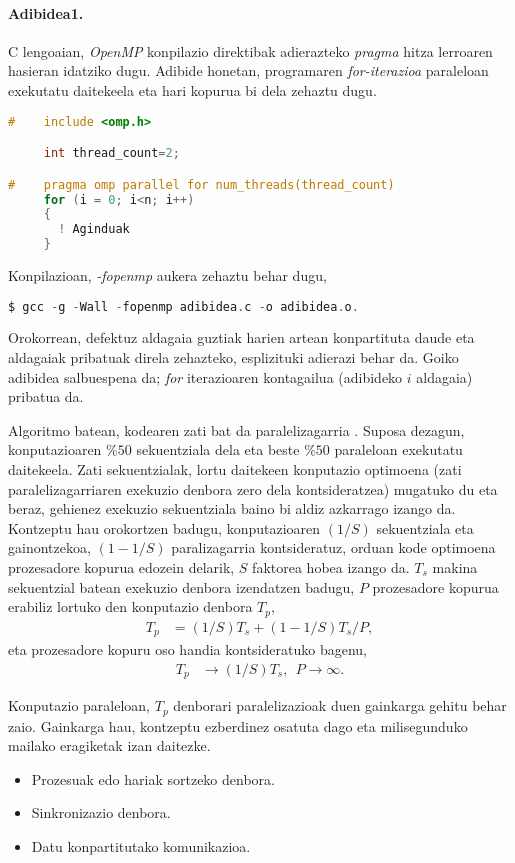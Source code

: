 \paragraph*{\textbf{Adibidea1.}} C lengoaian, \emph{OpenMP} konpilazio direktibak adierazteko \emph{pragma} hitza lerroaren hasieran idatziko dugu. Adibide honetan, programaren \emph{for-iterazioa} paraleloan exekutatu daitekeela  eta hari kopurua bi dela zehaztu dugu. 

\begin{lstlisting}[language=C]
#    include <omp.h>

     int thread_count=2;

#    pragma omp parallel for num_threads(thread_count) 
     for (i = 0; i<n; i++)
     {
       ! Aginduak 
     }
\end{lstlisting}

Konpilazioan, \emph{-fopenmp} aukera zehaztu behar dugu,
\begin{lstlisting}[language=C]
$ gcc -g -Wall -fopenmp adibidea.c -o adibidea.o.
\end{lstlisting}
Orokorrean, defektuz aldagaia guztiak harien artean konpartituta daude eta aldagaiak pribatuak direla zehazteko, esplizituki adierazi behar da. Goiko adibidea salbuespena da; \emph{for} iterazioaren kontagailua  (adibideko $i$ aldagaia) pribatua da.

Algoritmo batean, kodearen zati bat  da paralelizagarria \cite{Pacheco2011}. Suposa dezagun, konputazioaren $\%50$ sekuentziala dela eta beste $\%50$ paraleloan exekutatu daitekeela. Zati sekuentzialak, lortu daitekeen konputazio optimoena (zati paralelizagarriaren exekuzio denbora zero dela kontsideratzea) mugatuko du eta beraz, gehienez exekuzio sekuentziala baino bi aldiz azkarrago izango da. 
Kontzeptu hau orokortzen badugu, konputazioaren $(1/S)$ sekuentziala eta gainontzekoa, $(1-1/S)$ paralizagarria kontsideratuz, orduan kode optimoena prozesadore kopurua edozein delarik, $S$ faktorea hobea izango da. $T_s$ makina sekuentzial batean exekuzio denbora izendatzen badugu, $P$ prozesadore kopurua erabiliz lortuko den konputazio denbora $T_p$,
\begin{align*}
T_p &=(1/S)T_s + (1-1/S)T_s/P,
\end{align*}
eta prozesadore kopuru oso handia kontsideratuko bagenu,
\begin{align*}
T_p &\rightarrow (1/S) T_s ,  \ \ P \rightarrow \infty.
\end{align*} 

Konputazio paraleloan, $T_p$ denborari paralelizazioak duen gainkarga gehitu behar zaio. Gainkarga hau, kontzeptu ezberdinez osatuta dago eta milisegunduko mailako eragiketak izan daitezke.  
\begin{itemize}
\item Prozesuak edo hariak sortzeko denbora.
\item Sinkronizazio denbora.
\item Datu konpartitutako komunikazioa.
\end{itemize}

